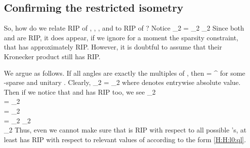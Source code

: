 \subsection {Confirming the restricted isometry}

So, how do we relate RIP of , , , and  to RIP of ?
Notice
 {
 _2
= _2  _2 
}
Since both  and  are  RIP, it does appear, if we ignore for a moment the sparsity constraint, that  has approximately  RIP.
However, it is doubtful to assume that their Kronecker product still has RIP.

We argue as follows.
If all angles  are exactly the multiples of , then
 {
=    ^\dagger 
}
for some -sparse  and unitary .
Clearly,
 {
 _2
= _2 
}
where  denotes entrywise absolute value.
Then if we notice that  and  has  RIP too, we see
 {
 _2 \\
%
= _2 \\
%
= _2 \\
%
= _2 \D
    _2 \\
%
\eqsim {} _2  
}
Thus, even we cannot make sure that  is  RIP with respect to all possible 's, at least  has RIP with respect to relevant values of  according to the form \eqref {H:H:l0:ql}.




